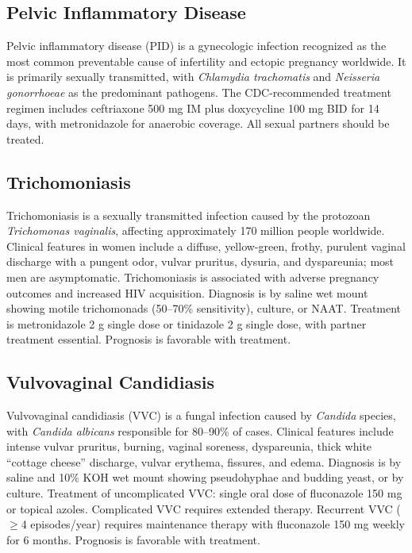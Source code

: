 \subsection{Pelvic Inflammatory Disease}
\label{sec:obstetric:Pelvic Inflammatory Disease}
Pelvic inflammatory disease (PID) is a gynecologic infection recognized as the most common preventable cause of infertility and ectopic pregnancy worldwide. It is primarily sexually transmitted, with \textit{Chlamydia trachomatis} and \textit{Neisseria gonorrhoeae} as the predominant pathogens. The CDC-recommended treatment regimen includes ceftriaxone 500 mg IM plus doxycycline 100 mg BID for 14 days, with metronidazole for anaerobic coverage. All sexual partners should be treated.

\subsection{Trichomoniasis}
\label{sec:Trichomoniasis}
Trichomoniasis is a sexually transmitted infection caused by the protozoan \textit{Trichomonas vaginalis}, affecting approximately 170 million people worldwide. Clinical features in women include a diffuse, yellow-green, frothy, purulent vaginal discharge with a pungent odor, vulvar pruritus, dysuria, and dyspareunia; most men are asymptomatic. Trichomoniasis is associated with adverse pregnancy outcomes and increased HIV acquisition. Diagnosis is by saline wet mount showing motile trichomonads (50--70\% sensitivity), culture, or NAAT. Treatment is metronidazole 2 g single dose or tinidazole 2 g single dose, with partner treatment essential. Prognosis is favorable with treatment.

\subsection{Vulvovaginal Candidiasis}
\label{sec:Vulvovaginal Candidiasis}
Vulvovaginal candidiasis (VVC) is a fungal infection caused by \textit{Candida} species, with \textit{Candida albicans} responsible for 80--90\% of cases. Clinical features include intense vulvar pruritus, burning, vaginal soreness, dyspareunia, thick white ``cottage cheese'' discharge, vulvar erythema, fissures, and edema. Diagnosis is by saline and 10\% KOH wet mount showing pseudohyphae and budding yeast, or by culture. Treatment of uncomplicated VVC: single oral dose of fluconazole 150 mg or topical azoles. Complicated VVC requires extended therapy. Recurrent VVC ($\ge$4 episodes/year) requires maintenance therapy with fluconazole 150 mg weekly for 6 months. Prognosis is favorable with treatment.

